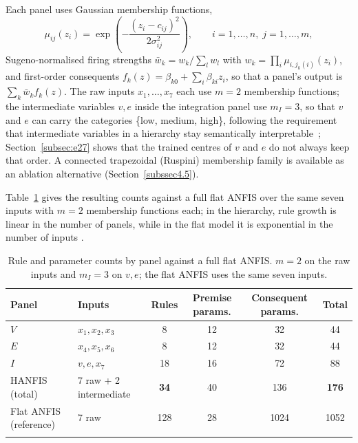 \documentclass[referee,lineno,pdflatex,sn-basic]{sn-jnl}%
\theoremstyle{thmstyleone}%
\theoremstyle{thmstyletwo}%
\theoremstyle{thmstylethree}%
\begin{document}
Each panel uses Gaussian membership functions,
\begin{equation}
\mu_{ij}(z_i)=\exp\!\left(-\frac{(z_i-c_{ij})^2}{2\sigma_{ij}^2}\right),\qquad i=1,\dots,n,\; j=1,\dots,m,
\end{equation}
Sugeno-normalised firing strengths $\bar w_k = w_k / \sum_l w_l$ with $w_k=\prod_i \mu_{i,j_k(i)}(z_i)$, and
first-order consequents $f_k(z)=\beta_{k0}+\sum_i \beta_{ki}z_i$, so that a panel's output is
$\sum_k \bar w_k f_k(z)$. The raw inputs $x_1,\dots,x_7$ each use $m=2$ membership functions; the
intermediate variables $v,e$ inside the integration panel use $m_I=3$, so that $v$ and $e$ can carry the categories \{low, medium, high\}, following the requirement that intermediate variables in a hierarchy stay semantically interpretable~\citep{lee2003hierarchical}; Section~\ref{subsec:e27} shows that the trained centres of $v$ and $e$ do not always keep that order. A connected trapezoidal (Ruspini) membership family is available as an ablation alternative (Section~\ref{subssec4.5}).

Table~\ref{tab:rules-params} gives the resulting counts against a full flat ANFIS over the same seven inputs with $m=2$ membership functions each; in the hierarchy, rule growth is linear in the number of panels, while in the flat model it is exponential in the number of inputs \citep{raju1991,wang1998hierarchical}.

\begin{table}[h]
\caption{Rule and parameter counts by panel against a full flat ANFIS. $m=2$ on the raw inputs and $m_I=3$ on $v,e$; the flat ANFIS uses the same seven inputs.}\label{tab:rules-params}
\begin{tabularx}{\textwidth}{@{}lXcccc@{}}
\toprule
Panel & Inputs & Rules & Premise params. & Consequent params. & Total \\
\midrule
$V$ & $x_1,x_2,x_3$ & 8 & 12 & 32 & 44 \\
$E$ & $x_4,x_5,x_6$ & 8 & 12 & 32 & 44 \\
$I$ & $v,e,x_7$ & 18 & 16 & 72 & 88 \\
HANFIS (total) & 7 raw + 2 intermediate & \textbf{34} & 40 & 136 & \textbf{176} \\
Flat ANFIS (reference) & 7 raw & 128 & 28 & 1024 & 1052 \\
\botrule
\end{tabularx}
\end{table}
\end{document}
